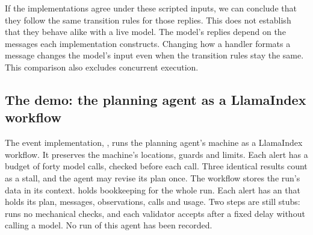 If the implementations agree under these scripted inputs, we can conclude that they follow the
same transition rules for those replies. This does not establish that they behave alike with a
live model. The model's replies depend on the messages each implementation constructs. Changing
how a handler formats a message changes the model's input even when the transition rules stay the
same. This comparison also excludes concurrent execution.

\subsection{The demo: the planning agent as a LlamaIndex workflow}
\label{sec:events-demo}

The event implementation, , runs the planning agent's machine as a
LlamaIndex workflow. It preserves the machine's locations, guards and limits. Each alert has a
budget of forty model calls, checked before each call. Three identical results count as a stall,
and the agent may revise its plan once. The workflow stores the run's data in its context.
 holds bookkeeping for the whole run. Each alert has an 
that holds its plan, messages, observations, calls and usage. Two steps are still stubs:
 runs no mechanical checks, and each validator accepts after a fixed delay
without calling a model. No run of this agent has been recorded.

